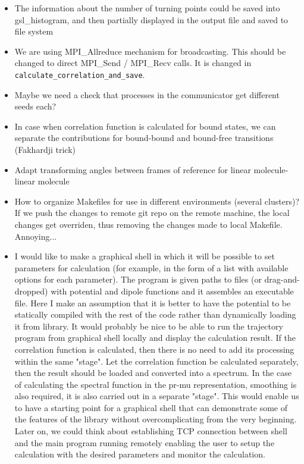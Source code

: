 \documentclass[color]{article}
\begin{document}
\begin{itemize}
    \item The information about the number of turning points could be saved into gsl\_histogram, and then partially displayed in the output file and saved to file system
    \item We are using MPI\_Allreduce mechanism for broadcasting. This should be changed to direct MPI\_Send / MPI\_Recv calls. {\color{red} It is changed in \texttt{calculate\_correlation\_and\_save}.}
    \item Maybe we need a check that processes in the communicator get different seeds each?
    \item In case when correlation function is calculated for bound states, we can separate the contributions for bound-bound and bound-free transitions (Fakhardji trick)
    \item Adapt transforming angles between frames of reference for linear molecule-linear molecule
    \item How to organize Makefiles for use in different environments (several clusters)? If we push the changes to remote git repo on the remote machine, the local changes get overriden, thus removing the changes made to local Makefile. Annoying... 
    \item I would like to make a graphical shell in which it will be possible to set parameters for calculation (for example, in the form of a list with available options for each parameter). The program is given paths to files (or drag-and-dropped) with potential and dipole functions and it assembles an executable file. Here I make an assumption that it is better to have the potential to be statically compiled with the rest of the code rather than dynamically loading it from library. It would probably be nice to be able to run the trajectory program from graphical shell locally and display the calculation result. If the correlation function is calculated, then there is no need to add its processing within the same "stage". Let the correlation function be calculated separately, then the result should be loaded and converted into a spectrum. In the case of calculating the spectral function in the pr-mu representation, smoothing is also required, it is also carried out in a separate "stage". This would enable us to have a starting point for a graphical shell that can demonstrate some of the features of the library without overcomplicating from the very beginning. Later on, we could think about establishing TCP connection between shell and the main program running remotely enabling the user to setup the calculation with the desired parameters and monitor the calculation. 
\end{itemize}
\end{document}
